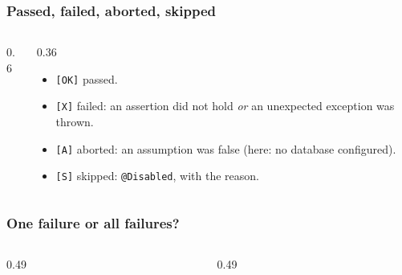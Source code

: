 \documentclass[aspectratio=169,10pt,compress]{beamer}
\begin{document}
\begin{frame}[t,fragile] \frametitle{Passed, failed, aborted, skipped}
  \begin{columns}[T]
    \begin{column}{0.6\textwidth}
    \end{column}
    \begin{column}{0.36\textwidth}
      \begin{itemize}\small
        \item \texttt{[OK]} passed.
        \item \texttt{[X]} failed: an assertion did not hold \emph{or} an unexpected exception was thrown.
        \item \texttt{[A]} aborted: an assumption was false (here: no database configured).
        \item \texttt{[S]} skipped: \texttt{@Disabled}, with the reason.
      \end{itemize}
    \end{column}
  \end{columns}
\end{frame}





\begin{frame}[t,fragile] \frametitle{One failure or all failures?}
  \begin{columns}[T]
    \begin{column}{0.49\textwidth}
    \end{column}
    \begin{column}{0.49\textwidth}
    \end{column}
  \end{columns}
\end{frame}
\end{document}
